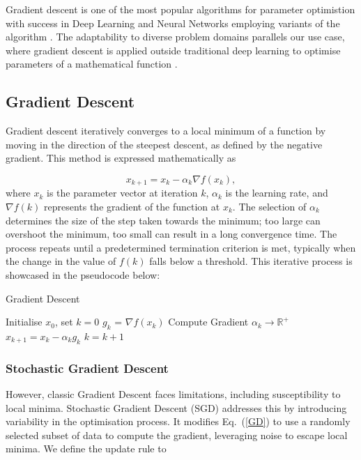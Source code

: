 \documentclass[a4paper]{report}
\begin{document}
Gradient descent is one of the most popular algorithms for parameter optimistion with success in Deep Learning and Neural Networks employing variants of the algorithm \citep{lu2017improved, zhang2019gradient, zeebaree2019trainable}. The adaptability to diverse problem domains \citep{YingjieYugiHaibin2023SGD} parallels our use case, where gradient descent is applied outside traditional deep learning to optimise parameters of a mathematical function \citep{GradientBasedOpt2022}.

\subsection{Gradient Descent}
Gradient descent iteratively converges to a local minimum of a function by moving in the direction of the steepest descent, as defined by the negative gradient. This method is expressed mathematically as

\begin{equation}\label{GD}
    x_{k+1} = x_k - \alpha_k \nabla f(x_k),
\end{equation}
where $x_k$ is the parameter vector at iteration $k$, $\alpha_k$ is the learning rate, and $\nabla f(k)$ represents the gradient of the function at $x_k$. The selection of $\alpha_k$ determines the size of the step taken towards the minimum; too large can overshoot the minimum, too small can result in a long convergence time. The process repeats until a predetermined termination criterion is met, typically when the change in the value of $f(k)$ falls below a threshold. This iterative process is showcased in the pseudocode below:

\begin{algorithm}
\caption{Gradient Descent}
\label{algo:gradient_descent}
\begin{algorithmic}[1]
\State Initialise \( x_0 \), set \( k = 0 \)
    \State $g_k$ = \( \nabla f(x_k) \) \Comment Compute Gradient
    \State $\alpha_k \rightarrow \mathbb{R}^+$
    \State $x_{k+1} = x_k - \alpha_k g_k$
    \State \( k = k + 1 \)
\EndWhile
\end{algorithmic}
\end{algorithm}

\subsubsection{Stochastic Gradient Descent}
However, classic Gradient Descent faces limitations, including susceptibility to local minima. Stochastic Gradient Descent (SGD) addresses this by introducing variability in the optimisation process. It modifies Eq.~(\ref{GD}) to use a randomly selected subset of data to compute the gradient, leveraging noise to escape local minima. We define the update rule to 
\end{document}
